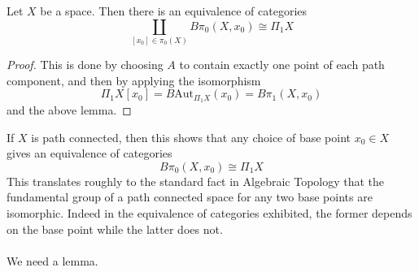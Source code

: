 \documentclass[a4paper]{article}
\begin{document}
\begin{crl}{}{} Let $X$ be a space. Then there is an equivalence of categories $$\coprod_{[x_0]\in\pi_0(X)}B\pi_0(X,x_0)\cong\Pi_1X$$ \tcbline
\begin{proof}
This is done by choosing $A$ to contain exactly one point of each path component, and then by applying the isomorphism $$\Pi_1X[x_0]=B\text{Aut}_{\Pi_1X}(x_0)=B\pi_1(X,x_0)$$ and the above lemma. 
\end{proof}
\end{crl}

If $X$ is path connected, then this shows that any choice of base point $x_0\in X$ gives an equivalence of categories $$B\pi_0(X,x_0)\cong\Pi_1X$$ This translates roughly to the standard fact in Algebraic Topology that the fundamental group of a path connected space for any two base points are isomorphic. Indeed in the equivalence of categories exhibited, the former depends on the base point while the latter does not. \\~\\

We need a lemma. 
\end{document}
